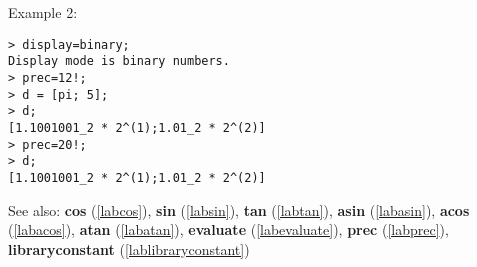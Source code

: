 \noindent Example 2: 
\begin{center}\begin{minipage}{15cm}\begin{Verbatim}[frame=single]
> display=binary;
Display mode is binary numbers.
> prec=12!;
> d = [pi; 5];
> d;
[1.1001001_2 * 2^(1);1.01_2 * 2^(2)]
> prec=20!;
> d;
[1.1001001_2 * 2^(1);1.01_2 * 2^(2)]
\end{Verbatim}
\end{minipage}\end{center}
See also: \textbf{cos} (\ref{labcos}), \textbf{sin} (\ref{labsin}), \textbf{tan} (\ref{labtan}), \textbf{asin} (\ref{labasin}), \textbf{acos} (\ref{labacos}), \textbf{atan} (\ref{labatan}), \textbf{evaluate} (\ref{labevaluate}), \textbf{prec} (\ref{labprec}), \textbf{libraryconstant} (\ref{lablibraryconstant})
